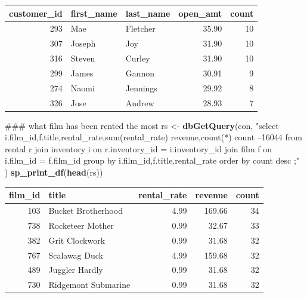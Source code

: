\documentclass[]{book}
\newenvironment{Shaded}{\begin{snugshade}}{\end{snugshade}}
\newcommand{\KeywordTok}[1]{\textcolor[rgb]{0.13,0.29,0.53}{\textbf{#1}}}
\newcommand{\NormalTok}[1]{#1}
\newcommand{\StringTok}[1]{\textcolor[rgb]{0.31,0.60,0.02}{#1}}
\theoremstyle{definition}
\theoremstyle{definition}
\theoremstyle{definition}
\theoremstyle{remark}
\begin{document}
\begin{tabular}{r|l|l|r|r}
\hline
customer\_id & first\_name & last\_name & open\_amt & count\\
\hline
293 & Mae & Fletcher & 35.90 & 10\\
\hline
307 & Joseph & Joy & 31.90 & 10\\
\hline
316 & Steven & Curley & 31.90 & 10\\
\hline
299 & James & Gannon & 30.91 & 9\\
\hline
274 & Naomi & Jennings & 29.92 & 8\\
\hline
326 & Jose & Andrew & 28.93 & 7\\
\hline
\end{tabular}

\begin{Shaded}
\begin{Highlighting}[]
\NormalTok{### what film has been rented the most}
\NormalTok{rs <-}\StringTok{ }\KeywordTok{dbGetQuery}\NormalTok{(con,}
                \StringTok{"select i.film_id,f.title,rental_rate,sum(rental_rate) revenue,count(*) count  --16044}
\StringTok{                   from rental r }
\StringTok{                        join inventory i}
\StringTok{                          on r.inventory_id = i.inventory_id}
\StringTok{                        join film f}
\StringTok{                          on i.film_id = f.film_id}
\StringTok{                 group by i.film_id,f.title,rental_rate}
\StringTok{                 order by count desc}
\StringTok{                 ;"}
\NormalTok{                )  }
\KeywordTok{sp_print_df}\NormalTok{(}\KeywordTok{head}\NormalTok{(rs))}
\end{Highlighting}
\end{Shaded}

\begin{tabular}{r|l|r|r|r}
\hline
film\_id & title & rental\_rate & revenue & count\\
\hline
103 & Bucket Brotherhood & 4.99 & 169.66 & 34\\
\hline
738 & Rocketeer Mother & 0.99 & 32.67 & 33\\
\hline
382 & Grit Clockwork & 0.99 & 31.68 & 32\\
\hline
767 & Scalawag Duck & 4.99 & 159.68 & 32\\
\hline
489 & Juggler Hardly & 0.99 & 31.68 & 32\\
\hline
730 & Ridgemont Submarine & 0.99 & 31.68 & 32\\
\hline
\end{tabular}
\end{document}
